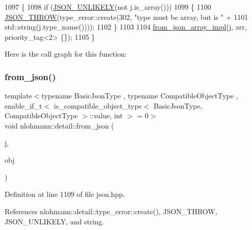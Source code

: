 \begin{DoxyCode}
1097 \{
1098     \textcolor{keywordflow}{if} (\hyperlink{json_8hpp_ab77582407c64944e7db1ea95ab520253}{JSON\_UNLIKELY}(not j.is\_array()))
1099     \{
1100         \hyperlink{json_8hpp_a6c274f6db2e65c1b66c7d41b06ad690f}{JSON\_THROW}(type\_error::create(302, \textcolor{stringliteral}{"type must be array, but is "} +
1101                                       std::string(j.type\_name())));
1102     \}
1103 
1104     \hyperlink{namespacenlohmann_1_1detail_a46b0781205d0bdc5a959343b389966a4}{from\_json\_array\_impl}(j, arr, priority\_tag<2> \{\});
1105 \}
\end{DoxyCode}
Here is the call graph for this function\+:
\mbox{\label{namespacenlohmann_1_1detail_a5e7a3674e8ac46f8feebad9712d7c55f}} 
\subsubsection{\texorpdfstring{from\+\_\+json()}{from\_json()}\hspace{0.1cm}{\footnotesize\ttfamily [11/14]}}
{\footnotesize\ttfamily template$<$typename Basic\+Json\+Type , typename Compatible\+Object\+Type , enable\+\_\+if\+\_\+t$<$ is\+\_\+compatible\+\_\+object\+\_\+type$<$ Basic\+Json\+Type, Compatible\+Object\+Type $>$\+::value, int $>$  = 0$>$ \\
void nlohmann\+::detail\+::from\+\_\+json (\begin{DoxyParamCaption}\item[{const Basic\+Json\+Type \&}]{j,  }\item[{Compatible\+Object\+Type \&}]{obj }\end{DoxyParamCaption})}



Definition at line 1109 of file json.\+hpp.



References nlohmann\+::detail\+::type\+\_\+error\+::create(), J\+S\+O\+N\+\_\+\+T\+H\+R\+OW, J\+S\+O\+N\+\_\+\+U\+N\+L\+I\+K\+E\+LY, and string.


